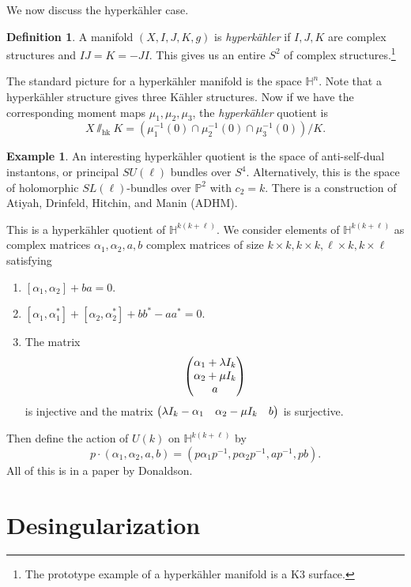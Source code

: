 \documentclass[leqno, openany]{memoir}
\theoremstyle{definition}
\newtheorem{defn}[thm]{Definition}
\newtheorem{exm}[thm]{Example}
\theoremstyle{remark}
\theoremstyle{plain}
\theoremstyle{definition}
\theoremstyle{remark}
\renewcommand{\P}{\mathbb{P}}
\newcommand{\mr}[1]{\mathrm{#1}}
\begin{document}
We now discuss the hyperk\"ahler case.

\begin{defn} A manifold $(X, I, J, K, g)$ is \textit{hyperk\"ahler} if $I, J,
    K$ are complex structures and $IJ = K = -JI$. This gives us an entire $S^2$
    of complex structures.\footnote{The prototype example of a hyperk\"ahler
    manifold is a K3 surface.} \end{defn}

The standard picture for a hyperk\"ahler manifold is the space $\mathbb{H}^n$.
Note that a hyperk\"ahler structure gives three K\"ahler structures. Now if we
have the corresponding moment maps $\mu_1, \mu_2, \mu_3$, the
\textit{hyperk\"ahler} quotient is \[ X \sslash_{\mr{hk}} K = (\mu_1^{-1}(0)
\cap \mu_2^{-1}(0) \cap \mu_3^{-1}(0)) / K. \]

\begin{exm} An interesting hyperk\"ahler quotient is the space of
    anti-self-dual instantons, or principal $SU(\ell)$ bundles over $S^4$.
    Alternatively, this is the space of holomorphic $SL(\ell)$-bundles over
    $\P^2$ with $c_2 = k$. There is a construction of Atiyah, Drinfeld,
    Hitchin, and Manin (ADHM). 

    This is a hyperk\"ahler quotient of $\mathbb{H}^{k(k+\ell)}$. We consider
    elements of $\mathbb{H}^{k(k+\ell)}$ as complex matrices $\alpha_1,
    \alpha_2, a, b$ complex matrices of size $k \times k, k \times k, \ell
    \times k, k \times \ell$ satisfying \begin{enumerate} \item $[\alpha_1,
        \alpha_2] + ba = 0$.  \item $[\alpha_1, \alpha_1^*] + [\alpha_2,
        \alpha_2^*] + bb^* - aa^* = 0$.  \item The matrix \[ \mqty( \alpha_1 +
        \lambda I_k \\ \alpha_2 + \mu I_k \\ a ) \] is injective and the matrix
        $\mqty(\lambda I_k - \alpha_1 & \alpha_2 - \mu I_k & b)$ is surjective.
    \end{enumerate} Then define the action of $U(k)$ on
    $\mathbb{H}^{k(k+\ell)}$ by \[ p \cdot (\alpha_1, \alpha_2, a, b) = (p
    \alpha_1 p^{-1}, p \alpha_2 p^{-1}, a p^{-1}, pb). \] All of this is in a
paper by Donaldson.  \end{exm}

\section{Desingularization}%
\end{document}
